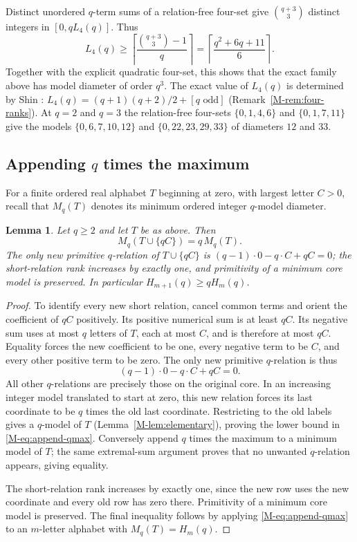 \documentclass[11pt,reqno]{amsart}
\theoremstyle{plain}
\newtheorem{lemma}[theorem]{Lemma}
\theoremstyle{definition}
\theoremstyle{plain}
\theoremstyle{plain}
\theoremstyle{plain}
\theoremstyle{plain}
\theoremstyle{plain}
\theoremstyle{plain}
\theoremstyle{definition}
\theoremstyle{definition}
\theoremstyle{definition}
\theoremstyle{plain}
\begin{document}
Distinct unordered $q$-term sums of a relation-free four-set give
$\binom{q+3}{3}$ distinct integers in $[0,qL_4(q)]$. Thus
\[
 L_4(q)\ge\left\lceil\frac{\binom{q+3}{3}-1}{q}\right\rceil
 =\left\lceil\frac{q^2+6q+11}{6}\right\rceil.
\]
Together with the explicit quadratic four-set, this shows that the exact
family above has model diameter of order $q^3$. The exact value of
$L_4(q)$ is determined by Shin \cite[Theorem~10.3]{M-Shin26}:
$L_4(q)=(q+1)(q+2)/2+[q\text{ odd}]$ (Remark~\ref{M-rem:four-ranks}). At $q=2$
and $q=3$ the relation-free four-sets $\{0,1,4,6\}$ and $\{0,1,7,11\}$ give
the models $\{0,6,7,10,12\}$ and $\{0,22,23,29,33\}$ of diameters $12$
and $33$.

\subsection{Appending $q$ times the maximum}
For a finite ordered real alphabet $T$ beginning at zero, with largest letter
$C>0$, recall that $M_q(T)$ denotes its minimum ordered integer $q$-model
diameter.

\begin{lemma}\label{M-lem:append-qmax}
Let $q\ge2$ and let $T$ be as above. Then
\begin{equation}\label{M-eq:append-qmax}
 M_q(T\cup\{qC\})=q\,M_q(T).
\end{equation}
The only new primitive $q$-relation of $T\cup\{qC\}$ is
$(q-1)\cdot0-q\cdot C+qC=0$; the short-relation rank increases by exactly
one, and primitivity of a minimum core model is preserved. In particular
$H_{m+1}(q)\ge qH_m(q)$.
\end{lemma}
\begin{proof}
To identify every new short relation, cancel common terms and orient the
coefficient of $qC$ positively. Its positive numerical sum is at least $qC$.
Its negative sum uses at most $q$ letters of $T$, each at most $C$, and is
therefore at most $qC$. Equality forces the new coefficient to be one, every
negative term to be $C$, and every other positive term to be zero. The only
new primitive $q$-relation is thus
\[
 (q-1)\cdot0-q\cdot C+qC=0 .
\]
All other $q$-relations are precisely those on the original core. In an
increasing integer model translated to start at zero, this new relation
forces its last coordinate to be $q$ times the old last coordinate.
Restricting to the old labels gives a $q$-model of $T$
(Lemma~\ref{M-lem:elementary}), proving the lower bound in
\eqref{M-eq:append-qmax}. Conversely append $q$ times the maximum to a minimum
model of $T$; the same extremal-sum argument proves that no unwanted
$q$-relation appears, giving equality.

The short-relation rank increases by exactly one, since the new row uses the
new coordinate and every old row has zero there. Primitivity of a minimum
core model is preserved. The final inequality follows by applying
\eqref{M-eq:append-qmax} to an $m$-letter alphabet with $M_q(T)=H_m(q)$.
\end{proof}
\end{document}
